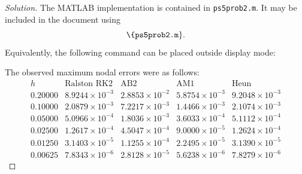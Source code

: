 \documentclass[12pt]{amsart}
\newenvironment{solution}
{\begin{proof}[Solution]}
{\end{proof}}
\begin{document}
\begin{onehalfspace}
\begin{solution}
            \medskip
            \noindent
            The MATLAB implementation is contained in
            \texttt{ps5prob2.m}. It may be included in the
            document using
            \[
                \texttt{\string
                    \{ps5prob2.m}\}.
            \]
            Equivalently, the following command can be placed outside
            display mode:
            

            The observed maximum nodal errors were as follows:
            \[
                \begin{array}{c|cccc}
                    h
                    & \text{Ralston RK2}
                    & \text{AB2}
                    & \text{AM1}
                    & \text{Heun}\\ \hline
                    0.20000
                    & 8.9244\times10^{-3}
                    & 2.8853\times10^{-2}
                    & 5.8754\times10^{-3}
                    & 9.2048\times10^{-3}\\
                    0.10000
                    & 2.0879\times10^{-3}
                    & 7.2217\times10^{-3}
                    & 1.4466\times10^{-3}
                    & 2.1074\times10^{-3}\\
                    0.05000
                    & 5.0966\times10^{-4}
                    & 1.8036\times10^{-3}
                    & 3.6033\times10^{-4}
                    & 5.1112\times10^{-4}\\
                    0.02500
                    & 1.2617\times10^{-4}
                    & 4.5047\times10^{-4}
                    & 9.0000\times10^{-5}
                    & 1.2624\times10^{-4}\\
                    0.01250
                    & 3.1403\times10^{-5}
                    & 1.1255\times10^{-4}
                    & 2.2495\times10^{-5}
                    & 3.1390\times10^{-5}\\
                    0.00625
                    & 7.8343\times10^{-6}
                    & 2.8128\times10^{-5}
                    & 5.6238\times10^{-6}
                    & 7.8279\times10^{-6}
                \end{array}
            \]


\end{solution}
\end{onehalfspace}
\end{document}
